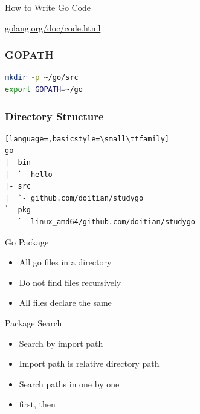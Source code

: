 \documentclass[xetex,mathserif,serif,12pt]{beamer}
\begin{document}
\begin{frame}{How to Write Go Code}

  {\large \href{http://golang.org/doc/code.html}{golang.org/doc/code.html}}

\end{frame}

\begin{frame}[fragile]
  \frametitle{\ttfamily GOPATH}

  \begin{beamer@nomargin}
    \begin{lstlisting}[language=Bash]
mkdir -p ~/go/src
export GOPATH=~/go
    \end{lstlisting}
  \end{beamer@nomargin}
\end{frame}

\begin{frame}[fragile]
  \frametitle{Directory Structure}

  \begin{beamer@nomargin}
    \begin{lstlisting}[language=,basicstyle=\small\ttfamily]
go
|- bin
|  `- hello
|- src
|  `- github.com/doitian/studygo
`- pkg
   `- linux_amd64/github.com/doitian/studygo
    \end{lstlisting}
  \end{beamer@nomargin}
\end{frame}

\begin{frame}{Go Package}
  \begin{itemize}[<+->]
  \item All go files in a directory
  \item Do not find files recursively
  \item All files declare the same 
  \end{itemize}
\end{frame}

\begin{frame}{Package Search}
  \begin{itemize}[<+->]
  \item Search by import path
  \item Import path is relative directory path
  \item Search paths in  one by one
  \item {} first, then 
  \end{itemize}
\end{frame}
\end{document}
